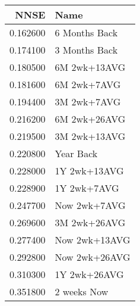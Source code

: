 \begin{tabular}{rl}
NNSE & Name \\
\hline
0.162600 & 6 Months Back \\
0.174100 & 3 Months Back \\
0.180500 & 6M 2wk+13AVG \\
0.181600 & 6M 2wk+7AVG \\
0.194400 & 3M 2wk+7AVG \\
0.216200 & 6M 2wk+26AVG \\
0.219500 & 3M 2wk+13AVG \\
0.220800 & Year Back \\
0.228000 & 1Y 2wk+13AVG \\
0.228900 & 1Y 2wk+7AVG \\
0.247700 & Now 2wk+7AVG \\
0.269600 & 3M 2wk+26AVG \\
0.277400 & Now 2wk+13AVG \\
0.292800 & Now 2wk+26AVG \\
0.310300 & 1Y 2wk+26AVG \\
0.351800 & 2 weeks Now \\
\hline
\end{tabular}